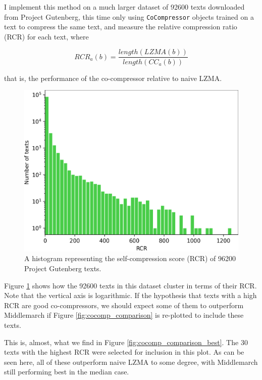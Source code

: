 I implement this method on a much larger dataset of 92600 texts downloaded from Project Gutenberg, this time only using \texttt{CoCompressor} objects trained on a text to compress the same text, and measure the relative compression ratio (RCR) for each text, where

$$RCR_a(b) = \frac{length(LZMA(b))}{length(CC_a(b))}$$

that is, the performance of the co-compressor relative to naive LZMA.

\begin{figure}[h]
\centering
\includegraphics[width=\textwidth]{img/fig_self-compression_histogram.png}
\caption{A histogram representing the self-compression score (RCR) of 96200 Project Gutenberg texts.}
\label{fig:self_compression_histogram}
\end{figure}

Figure \ref{fig:self_compression_histogram} shows how the 92600 texts in this dataset cluster in terms of their RCR. Note that the vertical axis is logarithmic. If the hypothesis that texts with a high RCR are good co-compressors, we should expect some of them to outperform Middlemarch if Figure \ref{fig:cocomp_comparison} is re-plotted to include these texts.

This is, almost, what we find in Figure \ref{fig:cocomp_comparison_best}. The 30 texts with the highest RCR were selected for inclusion in this plot. As can be seen here, all of these outperform naive LZMA to some degree, with Middlemarch still performing best in the median case.

